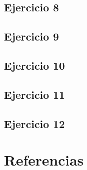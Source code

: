 \documentclass[spanish, a4paper, 11pt]{article}
\begin{document}
\subsection{Ejercicio 8}
\subsection{Ejercicio 9}
\subsection{Ejercicio 10}
\subsection{Ejercicio 11}
\subsection{Ejercicio 12}


\clearpage
\section{Referencias}
\begin{itemize}
\end{itemize}
\end{document}
